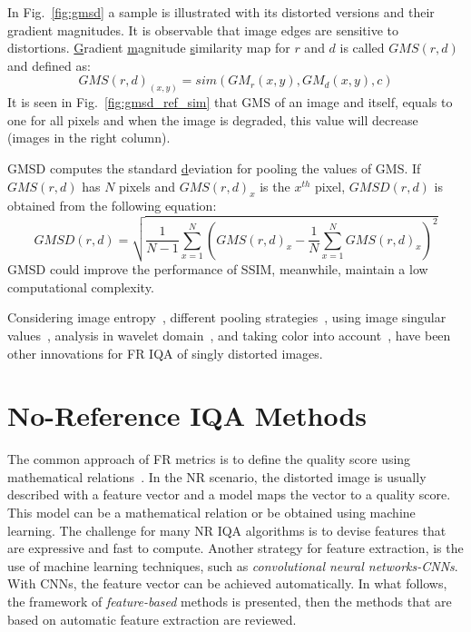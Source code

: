 In Fig.~\ref{fig:gmsd} a sample is illustrated with its distorted versions and their gradient magnitudes. It is observable that image edges are sensitive to distortions. \underline{G}radient \underline{m}agnitude \underline{s}imilarity map for $r$ and $d$ is called $GMS(r, d)$ and defined as:
\begin{equation}
    GMS(r, d)_{(x, y)} = sim\left(GM_r(x, y), GM_d(x, y), c\right)
    \label{eq:gms}
\end{equation}
It is seen in Fig.~\ref{fig:gmsd_ref_sim} that GMS of an image and itself, equals to one for all pixels and when the image is degraded, this value will decrease (images in the right column).

GMSD computes the standard \underline{d}eviation for pooling the values of GMS. If $GMS(r, d)$ has $N$ pixels and $GMS(r, d)_x$ is the $x^{th}$ pixel, $GMSD(r, d)$ is obtained from the following equation:
\begin{equation}
    GMSD(r, d) = \sqrt{\frac{1}{N-1}\sum_{x=1}^{N}\left(GMS(r, d)_x-\frac{1}{N}\sum_{x=1}^NGMS(r, d)_x\right)^2}
\end{equation}
GMSD could improve the performance of SSIM, meanwhile, maintain a low computational complexity.

Considering image entropy~\cite{Sheikh2005, Sheikh2006}, different pooling strategies~\cite{Zhang2014a}, using image singular values~\cite{Mansouri2009, Mansouri2019}, analysis in wavelet domain~\cite{Chandler2007}, and taking color into account~\cite{Zhang2011a}, have been other innovations for FR IQA of singly distorted images.
\section{No-Reference IQA Methods}
The common approach of FR metrics is to define the quality score using mathematical relations~\cite{lin2010perceptual}. In the NR scenario, the distorted image is usually described with a feature vector and a model maps the vector to a quality score. This model can be a mathematical relation or be obtained using machine learning. The challenge for many NR IQA algorithms is to devise features that are expressive and fast to compute. Another strategy for feature extraction, is the use of machine learning techniques, such as \emph{convolutional neural networks-CNNs}. With CNNs, the feature vector can be achieved automatically. In what follows, the framework of \emph{feature-based} methods is presented, then the methods that are based on automatic feature extraction are reviewed.

